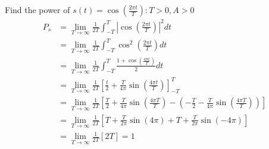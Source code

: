 \begin{example}
    Find the power of $s (t) = \cos(\frac{2\pi t}{T}) : T > 0, A > 0$ \\
    \begin{align}
        P_s & = \lim_{T \to \infty} \frac{1}{2T} \int_{-T}^{T} |\cos(\frac{2\pi t}{T})|^2 dt                                                                                              \\
            & = \lim_{T \to \infty} \frac{1}{2T} \int_{-T}^{T} \cos^2(\frac{2\pi t}{T}) dt                                                                                                \\
            & = \lim_{T \to \infty} \frac{1}{2T} \int_{-T}^{T} \frac{1 + \cos(\frac{4\pi t}{T})}{2} dt                                                                                    \\
            & = \lim_{T \to \infty} \frac{1}{2T} \left[ \frac{t}{2} + \frac{T}{4\pi} \sin(\frac{4\pi t}{T}) \right]_{-T}^{T}                                                              \\
            & = \lim_{T \to \infty} \frac{1}{2T} \left[ \frac{T}{2} + \frac{T}{4\pi} \sin(\frac{4\pi T}{T}) - \left( -\frac{T}{2} - \frac{T}{4\pi} \sin(\frac{4\pi T}{T}) \right) \right] \\
            & = \lim_{T \to \infty} \frac{1}{2T} \left[ T + \frac{T}{2\pi} \sin(4\pi) + T + \frac{T}{2\pi} \sin(-4\pi) \right]                                                            \\
            & = \lim_{T \to \infty} \frac{1}{2T} \left[ 2T \right] = 1
    \end{align}
\end{example}